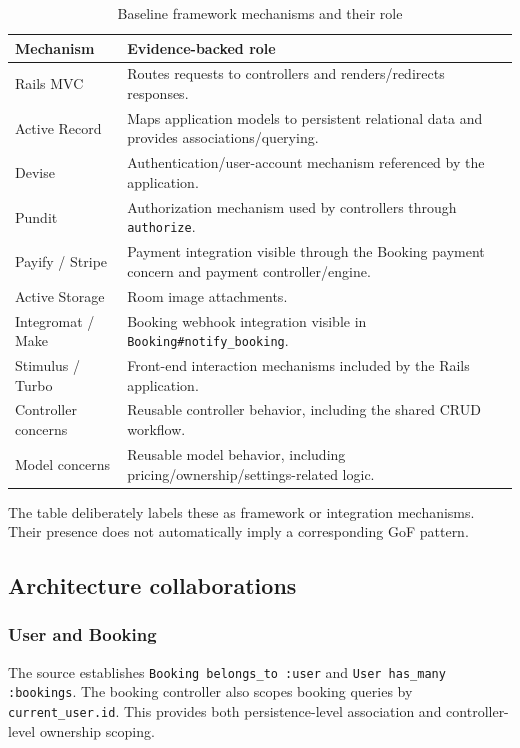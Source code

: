 \documentclass[10pt,a4paper]{article}
\newcommand{\code}[1]{\texttt{\small #1}}
\begin{document}
\begin{table}[H]
\centering
\caption{Baseline framework mechanisms and their role}
\label{tab:framework}
\begin{tabularx}{\linewidth}{lX}
\toprule
Mechanism & Evidence-backed role\\
\midrule
Rails MVC & Routes requests to controllers and renders/redirects responses.\\
Active Record & Maps application models to persistent relational data and provides associations/querying.\\
Devise & Authentication/user-account mechanism referenced by the application.\\
Pundit & Authorization mechanism used by controllers through \code{authorize}.\\
Payify / Stripe & Payment integration visible through the Booking payment concern and payment controller/engine.\\
Active Storage & Room image attachments.\\
Integromat / Make & Booking webhook integration visible in \code{Booking\#notify\_booking}.\\
Stimulus / Turbo & Front-end interaction mechanisms included by the Rails application.\\
Controller concerns & Reusable controller behavior, including the shared CRUD workflow.\\
Model concerns & Reusable model behavior, including pricing/ownership/settings-related logic.\\
\bottomrule
\end{tabularx}
\end{table}

The table deliberately labels these as framework or integration mechanisms. Their presence does not automatically imply a corresponding GoF pattern.

\subsection{Architecture collaborations}

\subsubsection{User and Booking}

The source establishes \code{Booking belongs\_to :user} and \code{User has\_many :bookings}. The booking controller also scopes booking queries by \code{current\_user.id}. This provides both persistence-level association and controller-level ownership scoping.
\end{document}

